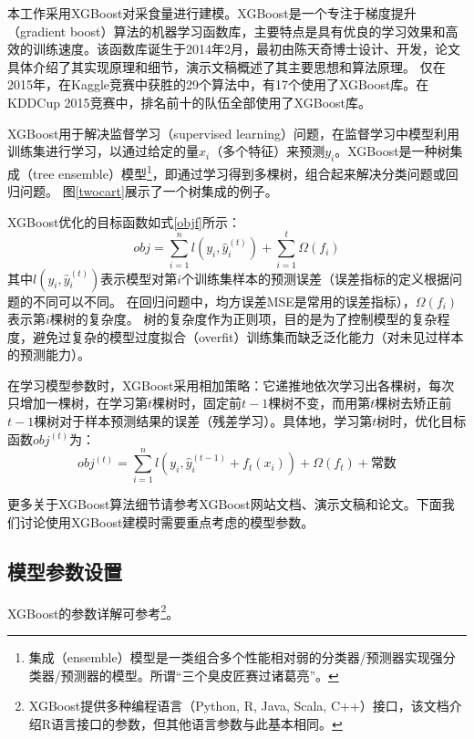 本工作采用XGBoost对采食量进行建模。XGBoost\cite{xgboost_github}是一个专注于梯度提升（gradient boost）算法的机器学习函数库，主要特点是具有优良的学习效果和高效的训练速度。该函数库诞生于2014年2月，最初由陈天奇博士设计、开发，论文\cite{Chen2016XGBoost}具体介绍了其实现原理和细节，演示文稿\cite{xgboost_slides}概述了其主要思想和算法原理。
仅在2015年，在Kaggle\cite{kaggle}竞赛中获胜的29个算法中，有17个使用了XGBoost库。在KDDCup 2015\cite{kddcup2015}竞赛中，排名前十的队伍全部使用了XGBoost库。

XGBoost用于解决监督学习（supervised learning）问题，在监督学习中模型利用训练集进行学习，以通过给定的量$x_i$（多个特征）来预测$y_i$。XGBoost是一种树集成（tree ensemble）模型\footnote{集成（ensemble）模型是一类组合多个性能相对弱的分类器/预测器实现强分类器/预测器的模型。所谓“三个臭皮匠赛过诸葛亮”。}，即通过学习得到多棵树，组合起来解决分类问题或回归问题。
图\ref{twocart}展示了一个树集成的例子。

XGBoost优化的目标函数如式\ref{objf}所示：
\begin{equation}
\label{objf}
	obj = \sum_{i=1}^n l(y_i, \hat y_i^{(t)}) + \sum_{i=1}^t \Omega(f_i)
\end{equation}
其中$l(y_i, \hat y_i^{(t)})$表示模型对第$i$个训练集样本的预测误差（误差指标的定义根据问题的不同可以不同。
在回归问题中，均方误差MSE是常用的误差指标），$\Omega(f_i)$表示第$i$棵树的复杂度。
树的复杂度作为正则项，目的是为了控制模型的复杂程度，避免过复杂的模型过度拟合（overfit）训练集而缺乏泛化能力（对未见过样本的预测能力）。

在学习模型参数时，XGBoost采用相加策略：它递推地依次学习出各棵树，每次只增加一棵树，在学习第$t$棵树时，固定前$t-1$棵树不变，而用第$t$棵树去矫正前$t-1$棵树对于样本预测结果的误差（残差学习）。具体地，学习第$t$树时，优化目标函数$obj^{(t)}$为：
\begin{equation}
\label{objf_eachtree}
	obj^{(t)} = \sum_{i=1}^n l(y_i, \hat y_i^{(t-1)} + f_t(x_i)) + \Omega(f_t) + \textrm{常数}
\end{equation}

更多关于XGBoost算法细节请参考XGBoost网站文档、演示文稿和论文\cite{intro_xgboost, xgboost_slides,Chen2016XGBoost}。下面我们讨论使用XGBoost建模时需要重点考虑的模型参数。

\subsection{模型参数设置}

XGBoost的参数详解可参考\cite{xgboost_para}\footnote{XGBoost提供多种编程语言（Python, R, Java, Scala, C++）接口，该文档介绍R语言接口的参数，但其他语言参数与此基本相同。}。

